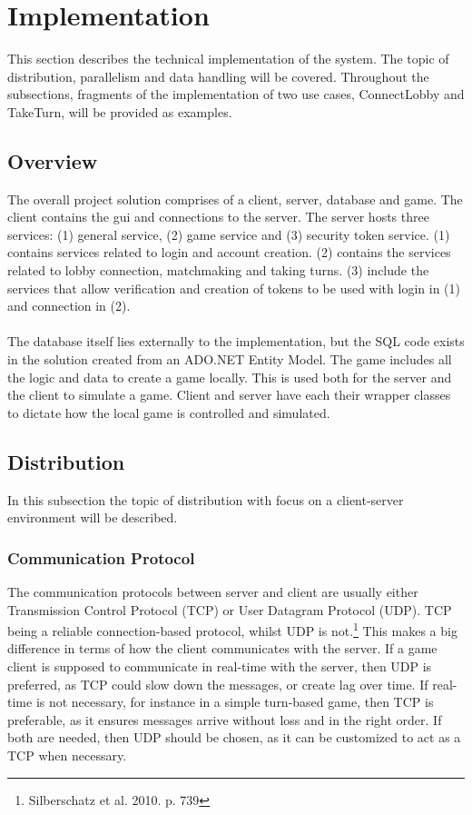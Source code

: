 \section {Implementation}
This section describes the technical implementation of the system.
The topic of distribution, parallelism and data handling will be covered.
 Throughout the subsections, fragments of the implementation of two use cases,
  ConnectLobby and TakeTurn, will be provided as examples.

\subsection {Overview}

The overall project solution comprises of a client, server, database and game.
 The client contains the gui and connections to the server. The server hosts
  three services: (1) general service, (2) game service and (3) security token
   service. (1) contains services related to login and account creation. (2)
   contains the services related to lobby connection, matchmaking and taking
    turns. (3) include the services that allow verification and creation of
     tokens to be used with login in (1) and connection in (2).
\\\\
The database itself lies externally to the implementation, but the SQL code
 exists in the solution created from an ADO.NET Entity Model. The game
 includes all the logic and data to create a game locally. This is used
 both for the server and the client to simulate a game. Client and server
  have each their wrapper classes to dictate how the local game is
   controlled and simulated.

\subsection {Distribution}
In this subsection the topic of distribution with focus on a client-server
 environment will be described.

\subsubsection {Communication Protocol}
The communication protocols between server and client are usually either
 Transmission Control Protocol (TCP) or User Datagram Protocol (UDP).
 TCP being a reliable connection-based protocol, whilst UDP is
  not.\footnote{Silberschatz et al. 2010. p. 739} This makes a big
   difference in terms of how the client communicates with the server.
    If a game client is supposed to communicate in real-time with the server,
     then UDP is preferred, as TCP could slow down the messages, or create
      lag over time. If real-time is not necessary, for instance in a simple
       turn-based game, then TCP is preferable, as it ensures messages arrive
        without loss and in the right order. If both are needed, then UDP
        should be chosen, as it can be customized to act as a TCP
         when necessary.

